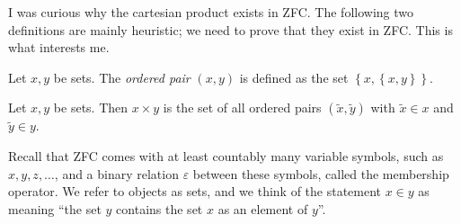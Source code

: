 
I was curious why the cartesian product exists in ZFC. The following two definitions are mainly heuristic; we need to prove that they exist in ZFC. This is what interests me.

\begin{definition}\label{dfn:1}
	Let $x,y$ be sets. The \emph{ordered pair} $(x,y)$ is defined as the set $\left\{ x,\left\{ x,y \right\}  \right\} $.
\end{definition}
\begin{definition}\label{dfn:2}
	Let $x,y$ be sets. Then $x\times y$ is the set of all ordered pairs $(\widetilde{x} ,\widetilde{y} )$ with $\widetilde{x} \in x$ and $\widetilde{y} \in y$.
\end{definition}

Recall that ZFC comes with at least countably many variable symbols, such as $x,y,z, \ldots $, and a binary relation $\varepsilon $ between these symbols, called the membership operator. We refer to objects as sets, and we think of the statement $x\in y$ as meaning ``the set $y$ contains the set $x$ as an element of $y$''.

